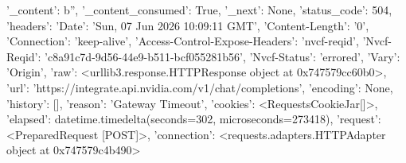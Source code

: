 
{'_content': b'', '_content_consumed': True, '_next': None, 'status_code': 504, 'headers': {'Date': 'Sun, 07 Jun 2026 10:09:11 GMT', 'Content-Length': '0', 'Connection': 'keep-alive', 'Access-Control-Expose-Headers': 'nvcf-reqid', 'Nvcf-Reqid': 'c8a91c7d-9d56-44e9-b511-bcf055281b56', 'Nvcf-Status': 'errored', 'Vary': 'Origin'}, 'raw': <urllib3.response.HTTPResponse object at 0x747579cc60b0>, 'url': 'https://integrate.api.nvidia.com/v1/chat/completions', 'encoding': None, 'history': [], 'reason': 'Gateway Timeout', 'cookies': <RequestsCookieJar[]>, 'elapsed': datetime.timedelta(seconds=302, microseconds=273418), 'request': <PreparedRequest [POST]>, 'connection': <requests.adapters.HTTPAdapter object at 0x747579c4b490>}
